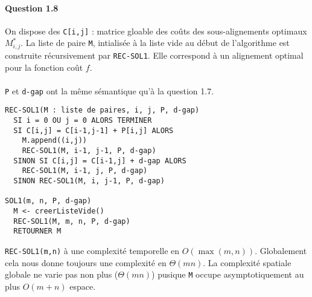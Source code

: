 \paragraph{Question 1.8}
On dispose des \verb'C[i,j]' : matrice gloable des co\^uts des sous-alignements
optimaux $M_{i,j}^*$.
La liste de paire \verb'M', intialis\'ee \`a la liste vide au d\'ebut
de l'algorithme est construite r\'ecursivement par
\verb'REC-SOL1'. Elle correspond \`a un alignement optimal pour la
fonction co\^ut $f$.\\\\
\verb'P' et \verb'd-gap' ont la m\^eme s\'emantique qu'\`a la question
1.7.
\begin{verbatim}
REC-SOL1(M : liste de paires, i, j, P, d-gap)
  SI i = 0 OU j = 0 ALORS TERMINER
  SI C[i,j] = C[i-1,j-1] + P[i,j] ALORS
    M.append((i,j))
    REC-SOL1(M, i-1, j-1, P, d-gap)
  SINON SI C[i,j] = C[i-1,j] + d-gap ALORS
    REC-SOL1(M, i-1, j, P, d-gap)
  SINON REC-SOL1(M, i, j-1, P, d-gap)

SOL1(m, n, P, d-gap)
  M <- creerListeVide()
  REC-SOL1(M, m, n, P, d-gap)
  RETOURNER M
\end{verbatim}
\verb'REC-SOL1(m,n)' \`a une complexit\'e temporelle en
$O(\max(m,n))$. Globalement cela nous donne toujours une complexit\'e
en $\Theta(mn)$. La complexit\'e spatiale globale ne varie pas non
plus ($\Theta(mn)$) pusique \verb'M' occupe asymptotiquement au plus
$O(m+n)$ espace.
